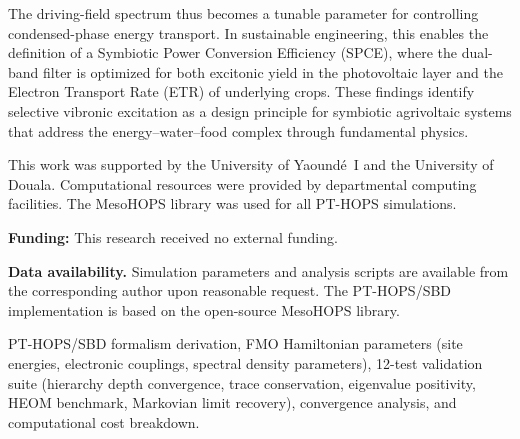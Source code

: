 \documentclass[journal=jpcl,manuscript=letter]{achemso}
\begin{document}
The driving-field spectrum thus becomes a tunable parameter for controlling condensed-phase energy transport. In sustainable engineering, this enables the definition of a Symbiotic Power Conversion Efficiency (SPCE), where the dual-band filter is optimized for both excitonic yield in the photovoltaic layer and the Electron Transport Rate (ETR) of underlying crops. These findings identify selective vibronic excitation as a design principle for symbiotic agrivoltaic systems that address the energy--water--food complex through fundamental physics.


\begin{acknowledgement}
This work was supported by the University of Yaoundé~I and the University of Douala. Computational resources were provided by departmental computing facilities. The MesoHOPS library was used for all PT-HOPS simulations.
\end{acknowledgement}

\vspace{1ex}
\noindent\textbf{Funding:} This research received no external funding.


\textbf{Data availability.} Simulation parameters and analysis scripts are available from the corresponding author upon reasonable request. The PT-HOPS/SBD implementation is based on the open-source MesoHOPS library.


\begin{suppinfo}
PT-HOPS/SBD formalism derivation, FMO Hamiltonian parameters (site energies, electronic couplings, spectral density parameters), 12-test validation suite (hierarchy depth convergence, trace conservation, eigenvalue positivity, HEOM benchmark, Markovian limit recovery), convergence analysis, and computational cost breakdown.
\end{suppinfo}



\end{document}
